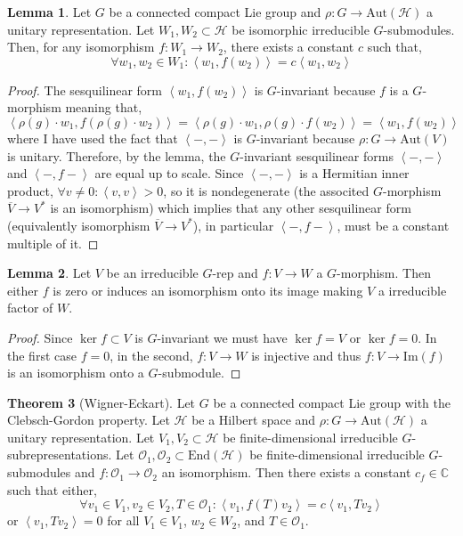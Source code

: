 \documentclass[12pt]{extarticle}
\newcommand{\End}[1]{\mathrm{End}\left(#1\right)}
\renewcommand{\Im}[1]{\mathrm{Im}(#1)}
\theoremstyle{definition}
\newtheorem{theorem}{Theorem}[section]
\newtheorem{lemma}[theorem]{Lemma}
\newcommand{\Aut}[1]{\mathrm{Aut}\left(#1 \right)}
\newcommand{\C}{\mathbb{C}}
\newcommand{\Hil}{\mathcal{H}}
\newcommand{\inner}[2]{\left< #1, #2 \right>}
\begin{document}
\begin{lemma}
Let $G$ be a connected compact Lie group and $\rho : G \to \Aut{\Hil}$ a unitary representation. Let $W_1, W_2 \subset \Hil$ be isomorphic irreducible $G$-submodules. Then, for any isomorphism $f : W_1 \to W_2$, there exists a constant $c$ such that,
\[ \forall w_1, w_2 \in W_1 : \inner{w_1}{f(w_2)} = c \inner{w_1}{w_2} \]
\end{lemma}

\begin{proof}
The sesquilinear form $\inner{w_1}{f(w_2)}$ is $G$-invariant because $f$ is a $G$-morphism meaning that,
\[ \inner{\rho(g) \cdot w_1}{f(\rho(g) \cdot w_2)} = \inner{\rho(g) \cdot w_1}{\rho(g) \cdot f(w_2)} = \inner{w_1}{f(w_2)} \]
where I have used the fact that $\inner{-}{-}$ is $G$-invariant because $\rho : G \to \Aut{V}$ is unitary. Therefore, by the lemma, the $G$-invariant sesquilinear forms $\inner{-}{-}$ and $\inner{-}{f-}$ are equal up to scale. Since $\inner{-}{-}$ is a Hermitian inner product, $\forall v \neq 0 : \inner{v}{v} > 0$, so it is nondegenerate (the associted $G$-morphism $\overline{V} \to V^*$ is an isomorphism) which implies that any other sesquilinear form (equivalently isomorphism $\overline{V} \to V^*$), in particular $\inner{-}{f-}$, must be a constant multiple of it. 
\end{proof}

\begin{lemma}
Let $V$ be an irreducible $G$-rep and $f : V \to W$ a $G$-morphism. Then either $f$ is zero or induces an isomorphism onto its image making $V$ a irreducible factor of $W$.
\end{lemma}

\begin{proof}
Since $\ker{f} \subset V$ is $G$-invariant we must have $\ker{f} = V$ or $\ker{f} = 0$. In the first case $f = 0$, in the second, $f : V \to W$ is injective and thus $f : V \to \Im{f}$ is an isomorphism onto a $G$-submodule.
\end{proof}

\begin{theorem}[Wigner-Eckart]
Let $G$ be a connected compact Lie group with the Clebsch-Gordon property. Let $\Hil$ be a Hilbert space and $\rho : G \to \Aut{\Hil}$ a unitary representation. Let $V_1, V_2 \subset \Hil$ be finite-dimensional irreducible $G$-subrepresentations. Let $\mathcal{O}_1, \mathcal{O}_2 \subset \End{\Hil}$ be finite-dimensional irreducible $G$-submodules and $f : \mathcal{O}_1 \to \mathcal{O}_2$ an isomorphism. Then there exists a constant $c_f \in \C$ such that either,
\[ \forall v_1 \in V_1, v_2 \in V_2, T \in \mathcal{O}_1 : \inner{v_1}{f(T) v_2} = c \inner{v_1}{T v_2} \]
or $\inner{v_1}{T v_2} = 0$ for all $V_1 \in V_1$, $w_2 \in W_2$, and $T \in \mathcal{O}_1$. 
\end{theorem}
\end{document}
